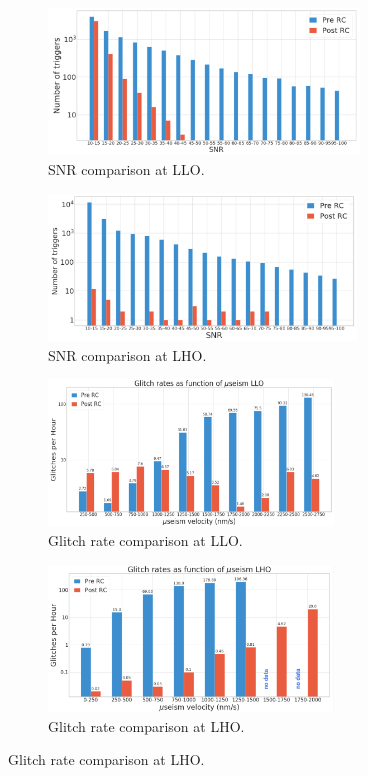 \documentclass[12pt]{iopart}
\begin{document}
\par
\begin{figure}[h]
\captionsetup[subfigure]{font=scriptsize,labelfont=scriptsize}
   \centering
    \begin{subfigure}[b]{0.45\textwidth}
        \centering
         \includegraphics[width= \textwidth,height=3.9cm]{snrpreandpost_LLO.png}
         \caption{SNR comparison at LLO.}
         \label{fig:snr_r0LLO}
    \end{subfigure}
    \hfill
    \begin{subfigure}[b]{0.45\textwidth}
        \centering
         \includegraphics[width =\textwidth,height=3.9cm]{snrpreandpost_LHO.png}
         \caption{SNR comparison  at LHO.}
         \label{fig:snr_r0LHO}
    \end{subfigure}
    \par\bigskip
    \begin{subfigure}[b]{0.45\textwidth}
        \centering
         \includegraphics[width= \textwidth,height=3.9cm]{glitchrate_LLO.png}
         \caption{Glitch rate comparison at LLO.}
         
         \label{fig:rate_LLO}
    \end{subfigure}
    \hfill
    \begin{subfigure}[b]{0.45\textwidth}
        \centering
         \includegraphics[width =\textwidth,height=3.9cm]{glitchrate_LHO.png}
         \caption{Glitch rate comparison at LHO.}
         \label{fig:rate_LHO}
    \end{subfigure}
    

\end{figure}
\end{document}
